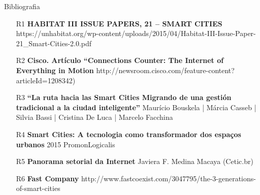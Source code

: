 \documentclass{beamer}
\begin{document}
\begin{frame}{Bibliografia}

\begin{enumerate}
 \item [R1]{\bf{HABITAT III ISSUE PAPERS, 21 – SMART CITIES}} {\tiny{https://unhabitat.org/wp-content/uploads/2015/04/Habitat-III-Issue-Paper-21\_Smart-Cities-2.0.pdf}} 
 \item [R2]{\bf{ Cisco. Artículo “Connections Counter: The Internet of Everything in Motion}} {\tiny{http://newsroom.cisco.com/feature-content?articleId=1208342)}}
 \item [R3]{\bf{``La ruta hacia las Smart Cities Migrando de una gestión tradicional a la ciudad inteligente''}} {\tiny{Maurício Bouskela | Márcia Casseb | Silvia Bassi | Cristina De Luca | Marcelo Facchina}}
 \item [R4]{\bf{Smart Cities: A tecnologia como transformador dos espaços urbanos}}{\tiny{ 2015 PromonLogicalis}} 
 \item [R5]{\bf{Panorama setorial da Internet}}{\tiny{ Javiera F. Medina Macaya (Cetic.br)}} 
 \item [R6]{\bf{Fast Company}} {\tiny{http://www.fastcoexist.com/3047795/the-3-generations-of-smart-cities}}
\end{enumerate}
\end{frame}
\end{document}
